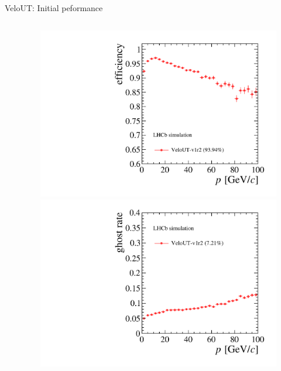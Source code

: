 \documentclass[aspectratio=1610]{beamer}
\begin{document}
\begin{frame}{VeloUT: Initial peformance}

\begin{columns}
\begin{column}{0.65\textwidth}
\end{column}
\begin{column}{0.35\textwidth}
\centering
\begin{figure}
\vspace*{-1cm}
\includegraphics[height=0.475\textheight]{figs/upstream-tracking-upgrade/eff_p_v1r2.pdf}\\
\includegraphics[height=0.475\textheight]{figs/upstream-tracking-upgrade/gr_p_v1r2.pdf}
\end{figure}
\end{column}
\end{columns}

\end{frame}
\end{document}
